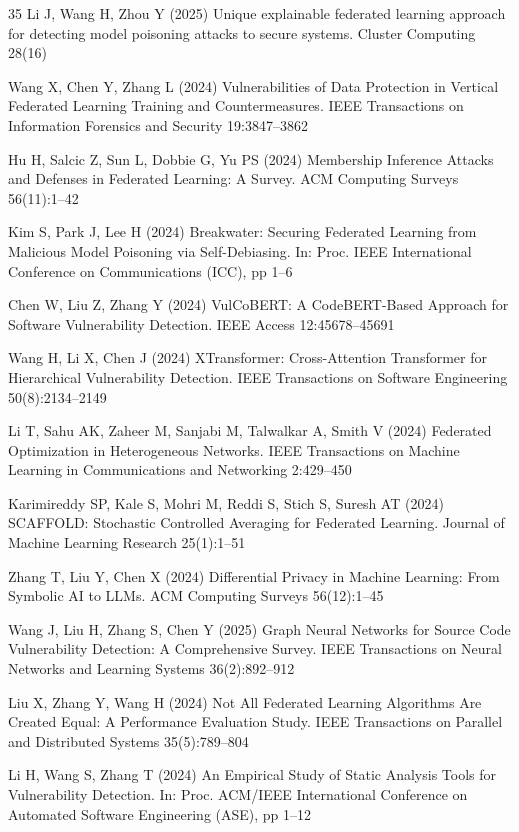 \documentclass[pdflatex,sn-mathphys-num]{sn-jnl}
\theoremstyle{thmstyleone}%
\theoremstyle{thmstyletwo}%
\theoremstyle{thmstylethree}%
\begin{document}
\begin{thebibliography}{35}
Li J, Wang H, Zhou Y (2025) Unique explainable federated learning approach for detecting model poisoning attacks to secure systems. Cluster Computing 28(16)

Wang X, Chen Y, Zhang L (2024) Vulnerabilities of Data Protection in Vertical Federated Learning Training and Countermeasures. IEEE Transactions on Information Forensics and Security 19:3847--3862

Hu H, Salcic Z, Sun L, Dobbie G, Yu PS (2024) Membership Inference Attacks and Defenses in Federated Learning: A Survey. ACM Computing Surveys 56(11):1--42

Kim S, Park J, Lee H (2024) Breakwater: Securing Federated Learning from Malicious Model Poisoning via Self-Debiasing. In: Proc. IEEE International Conference on Communications (ICC), pp 1--6

Chen W, Liu Z, Zhang Y (2024) VulCoBERT: A CodeBERT-Based Approach for Software Vulnerability Detection. IEEE Access 12:45678--45691

Wang H, Li X, Chen J (2024) XTransformer: Cross-Attention Transformer for Hierarchical Vulnerability Detection. IEEE Transactions on Software Engineering 50(8):2134--2149

Li T, Sahu AK, Zaheer M, Sanjabi M, Talwalkar A, Smith V (2024) Federated Optimization in Heterogeneous Networks. IEEE Transactions on Machine Learning in Communications and Networking 2:429--450

Karimireddy SP, Kale S, Mohri M, Reddi S, Stich S, Suresh AT (2024) SCAFFOLD: Stochastic Controlled Averaging for Federated Learning. Journal of Machine Learning Research 25(1):1--51

Zhang T, Liu Y, Chen X (2024) Differential Privacy in Machine Learning: From Symbolic AI to LLMs. ACM Computing Surveys 56(12):1--45

Wang J, Liu H, Zhang S, Chen Y (2025) Graph Neural Networks for Source Code Vulnerability Detection: A Comprehensive Survey. IEEE Transactions on Neural Networks and Learning Systems 36(2):892--912

Liu X, Zhang Y, Wang H (2024) Not All Federated Learning Algorithms Are Created Equal: A Performance Evaluation Study. IEEE Transactions on Parallel and Distributed Systems 35(5):789--804

Li H, Wang S, Zhang T (2024) An Empirical Study of Static Analysis Tools for Vulnerability Detection. In: Proc. ACM/IEEE International Conference on Automated Software Engineering (ASE), pp 1--12

\end{thebibliography}
\end{document}

